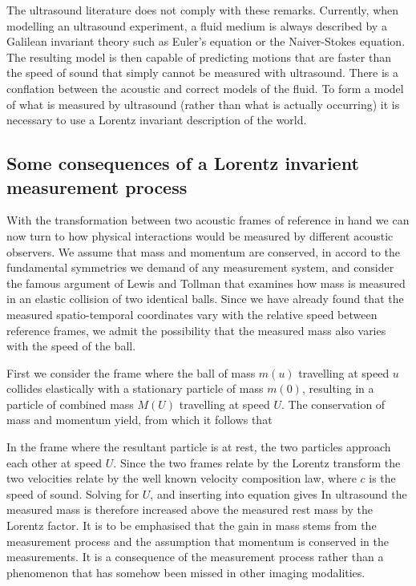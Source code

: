 The ultrasound literature does not comply with these remarks.
Currently, when modelling an ultrasound experiment, a fluid medium is always described by a Galilean invariant theory such as Euler's equation or the Naiver-Stokes equation.
The resulting model is then capable of predicting motions that are faster than the speed of sound
that simply cannot be measured with ultrasound.
There is a conflation between the acoustic and correct models of the fluid.
To form a model of what is measured by ultrasound (rather than what is actually occurring)
it is necessary to use a Lorentz invariant description of the world.

\subsection{Some  consequences of a Lorentz invarient measurement process}

With the transformation between two acoustic frames of reference in hand
we can now turn to how physical interactions would be measured  by different acoustic observers.
We assume that mass and momentum are conserved,
in accord to the fundamental symmetries we demand of any measurement system,
and consider the famous argument of Lewis and Tollman\cite{LewisTollman, PauliBook, DIvernoBook}
that examines how mass is measured in an elastic collision of two identical balls.
Since we have already found that the measured spatio-temporal coordinates vary with the relative speed between reference frames,
we admit the possibility that the measured mass also varies with the speed of the ball.


First we consider the frame where the ball of mass $m(u)$ travelling at speed $u$ collides elastically
with a stationary particle of mass $m(0)$, resulting in a particle of combined mass $M(U)$ travelling at speed $U$.
The conservation of mass and momentum yield,
from which it follows that

In the frame where the resultant particle is at rest,
the two particles approach each other at speed $U$.
Since the two frames relate by the Lorentz transform the two velocities relate by the well known velocity composition law,
where $c$ is the speed of sound.
Solving for $U$,
and inserting into equation  gives
In ultrasound the measured mass is therefore increased above the measured rest mass
by the Lorentz factor.
It is to be emphasised
that the gain in mass   stems from the measurement process and the assumption that momentum is conserved in the measurements.
It is a consequence of the measurement process rather than a phenomenon that has somehow been missed in other imaging modalities.

